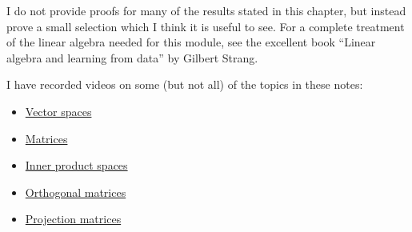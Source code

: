 \documentclass[]{book}
\providecommand{\tightlist}{%
  \setlength{\itemsep}{0pt}\setlength{\parskip}{0pt}}
\theoremstyle{definition}
\theoremstyle{definition}
\theoremstyle{definition}
\theoremstyle{remark}
\begin{document}
I do not provide proofs for many of the results stated in this chapter, but instead prove a small selection which I think it is useful to see. For a complete treatment of the linear algebra needed for this module, see the excellent book ``Linear algebra and learning from data'' by Gilbert Strang.

I have recorded videos on some (but not all) of the topics in these notes:

\begin{itemize}
\tightlist
\item
  \href{https://mediaspace.nottingham.ac.uk/media/Vector+Spaces/1_48xqrp04}{Vector spaces}
\item
  \href{https://mediaspace.nottingham.ac.uk/media/Matrices/1_nqo2u7zs}{Matrices}
\item
  \href{https://mediaspace.nottingham.ac.uk/media/Inner+Product+Spaces/1_nhcbybg3}{Inner product spaces}
\item
  \href{https://mediaspace.nottingham.ac.uk/media/Orthogonal+Matrices/1_rr2ervcs}{Orthogonal matrices}
\item
  \href{https://mediaspace.nottingham.ac.uk/media/Projection/1_soh726fg}{Projection matrices}
\end{itemize}

\renewcommand{\bY}{\boldsymbol Y}
\renewcommand{\bx}{\boldsymbol x}
\renewcommand{\bX}{\boldsymbol X}
\renewcommand{\bH}{\boldsymbol H}
\renewcommand{\by}{\boldsymbol y}
\renewcommand{\bz}{\boldsymbol z}
\renewcommand{\bS}{\boldsymbol S}
\renewcommand{\bR}{\boldsymbol R}
\renewcommand{\bmu}{\boldsymbol \mu}
\renewcommand{\bSigma}{\boldsymbol \Sigma}
\renewcommand{\bLambda}{\boldsymbol \Lambda}
\renewcommand{\bgamma}{\boldsymbol \gamma}
\renewcommand{\blambda}{\boldsymbol \lambda}
\renewcommand{\bA}{\boldsymbol A}
\renewcommand{\bB}{\boldsymbol B}
\renewcommand{\bD}{\boldsymbol D}
\renewcommand{\bC}{\boldsymbol C}
\renewcommand{\bR}{\boldsymbol R}
\renewcommand{\bM}{\boldsymbol M}
\renewcommand{\bP}{\boldsymbol P}
\renewcommand{\bQ}{\boldsymbol Q}
\renewcommand{\bT}{\boldsymbol T}
\renewcommand{\bW}{\boldsymbol W}
\renewcommand{\ba}{\boldsymbol a}
\renewcommand{\bb}{\boldsymbol b}
\renewcommand{\bc}{\boldsymbol c}
\renewcommand{\bd}{\boldsymbol d}
\renewcommand{\bh}{\boldsymbol h}
\renewcommand{\bp}{\boldsymbol p}
\renewcommand{\bq}{\boldsymbol q}
\renewcommand{\bu}{\boldsymbol u}
\renewcommand{\bzero}{\boldsymbol 0}
\renewcommand{\mR}{\mathbb R}
\renewcommand{\cR}{\mathcal R}

\renewcommand{\bs}{\boldsymbol}
\renewcommand{\ds}{\displaystyle}
\renewcommand{\tdiag}{\text{diag}}
\renewcommand{\ttr}{\text{tr}}
\renewcommand{\tdet}{\text{det}}
\end{document}
